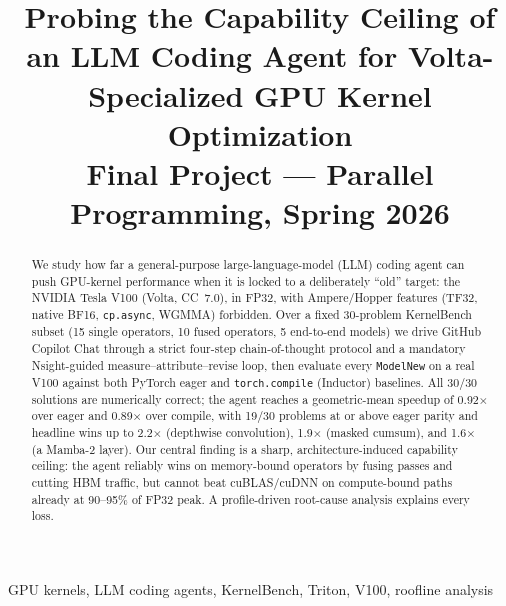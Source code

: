 \documentclass[conference]{IEEEtran}
\begin{document}
\title{Probing the Capability Ceiling of an LLM Coding Agent for
Volta-Specialized GPU Kernel Optimization\\
{\footnotesize Final Project --- Parallel Programming, Spring 2026}}

\author{%
%
}

\maketitle

\begin{abstract}
We study how far a general-purpose large-language-model (LLM) coding agent can
push GPU-kernel performance when it is locked to a deliberately ``old'' target:
the NVIDIA Tesla V100 (Volta, CC~7.0), in FP32, with Ampere/Hopper features
(TF32, native BF16, \texttt{cp.async}, WGMMA) forbidden. Over a fixed
30-problem KernelBench subset (15 single operators, 10 fused operators, 5
end-to-end models) we drive GitHub Copilot Chat through a strict four-step
chain-of-thought protocol and a mandatory Nsight-guided
measure--attribute--revise loop, then evaluate every \texttt{ModelNew} on a real
V100 against both PyTorch eager and \texttt{torch.compile} (Inductor) baselines.
All 30/30 solutions are numerically correct; the agent reaches a geometric-mean
speedup of 0.92$\times$ over eager and 0.89$\times$ over compile, with 19/30
problems at or above eager parity and headline wins up to 2.2$\times$ (depthwise
convolution), 1.9$\times$ (masked cumsum), and 1.6$\times$ (a Mamba-2 layer).
Our central finding is a sharp, architecture-induced capability ceiling: the
agent reliably wins on memory-bound operators by fusing passes and cutting HBM
traffic, but cannot beat cuBLAS/cuDNN on compute-bound paths already at
90--95\% of FP32 peak. A profile-driven root-cause analysis explains every
loss.
\end{abstract}

\begin{IEEEkeywords}
GPU kernels, LLM coding agents, KernelBench, Triton, V100, roofline analysis
\end{IEEEkeywords}
\end{document}
